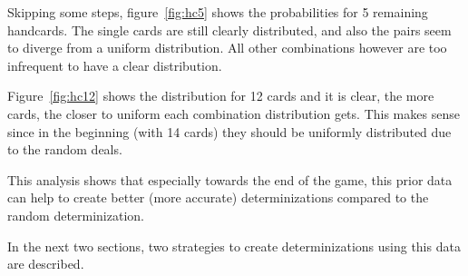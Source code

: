 Skipping some steps, figure~\ref{fig:hc5} shows the probabilities for 5 remaining handcards. The single cards are still clearly distributed, and also the pairs seem to diverge from a uniform distribution. All other combinations however are too infrequent to have a clear distribution.

Figure~\ref{fig:hc12} shows the distribution for 12 cards and it is clear, the more cards, the closer to uniform each combination distribution gets. This makes sense since in the beginning (with 14 cards) they should be uniformly distributed due to the random deals.

This analysis shows that especially towards the end of the game, this prior data can help to create better (more accurate) determinizations compared to the random determinization.

In the next two sections, two strategies to create determinizations using this data are described.


